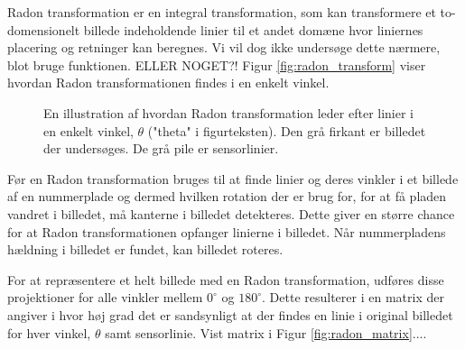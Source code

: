 Radon transformation er en integral transformation, som kan transformere et to-domensionelt billede indeholdende linier til et andet domæne hvor liniernes placering og retninger kan beregnes\cite{toft_radon}. Vi vil dog ikke undersøge dette nærmere, blot bruge funktionen. ELLER NOGET?! Figur \vref{fig:radon_transform} viser hvordan Radon transformationen findes i en enkelt vinkel.

\begin{figure}[htp]
  \centering
  \caption{En illustration af hvordan Radon transformation leder efter linier i en enkelt vinkel, $\theta$ ("theta" i figurteksten). Den grå firkant er billedet der undersøges. De grå pile er sensorlinier.\cite{matlab_radon}}
  \label{fig:radon_transform}
\end{figure}

Før en Radon transformation bruges til at finde linier og deres vinkler i et billede af en nummerplade og dermed hvilken rotation der er brug for, for at få pladen vandret i billedet, må kanterne i billedet detekteres. Dette giver en større chance for at Radon transformationen opfanger linierne i billedet. Når nummerpladens hældning i billedet er fundet, kan billedet roteres.

For at repræsentere et helt billede med en Radon transformation, udføres disse projektioner for alle vinkler mellem $0^{\circ}$ og $180^{\circ}$. Dette resulterer i en matrix der angiver i hvor høj grad det er sandsynligt at der findes en linie i original billedet for hver vinkel, $\theta$ samt sensorlinie. Vist matrix i Figur \vref{fig:radon_matrix}....

\begin{figure}[htp]
  \centering
  \caption{}
  \label{fig:radon_matrix}
\end{figure}

